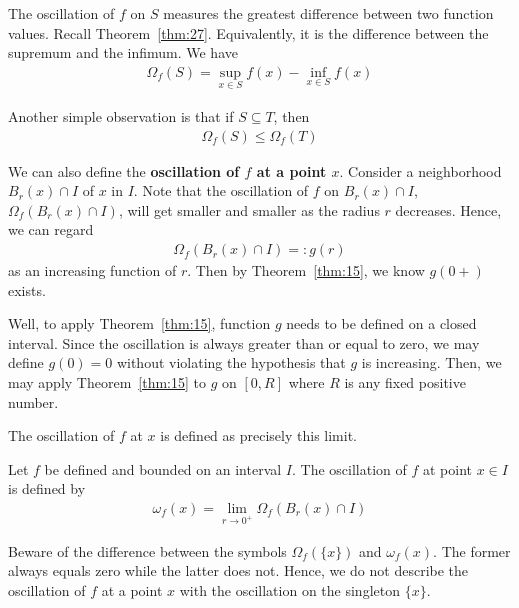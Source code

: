 \documentclass[thmcnt=section, 12pt]{my-elegantbook}
\begin{document}
The oscillation of $f$ on $S$ measures the
greatest difference between two function values.
Recall Theorem~\ref{thm:27}.
Equivalently, it is the difference between
the supremum and the infimum.
We have 
\begin{align*}
	\Omega_f (S)
	= \sup_{x \in S} f(x) - \inf_{x \in S} f(x)
\end{align*}

Another simple observation is that 
if $S \subseteq T$, then 
\begin{align*}
	\Omega_f(S) \leq \Omega_f(T)
\end{align*}


We can also define the \textbf{oscillation of $f$ at a point $x$}.
Consider a neighborhood $B_r(x) \cap I$ of $x$ in $I$.
Note that the oscillation of $f$ on $B_r(x) \cap I$, 
$\Omega_f(B_r(x) \cap I)$,
will get smaller and smaller
as the radius $r$ decreases.
Hence, we can regard 
\begin{align*}
	\Omega_f (B_r(x) \cap I) =: g(r)
\end{align*}
as an increasing function of $r$.
Then by Theorem~\ref{thm:15}, 
we know $g(0+)$ exists.
\begin{note}
	Well, to apply Theorem~\ref{thm:15},
	function $g$ needs to be defined on a closed interval.
	Since the oscillation is always greater than or equal to zero,
	we may define $g(0) = 0$
	without violating the hypothesis that $g$ is increasing.
	Then, we may apply Theorem~\ref{thm:15} to $g$ on $[0, R]$
	where $R$ is any fixed positive number.
\end{note}
\noindent The oscillation of $f$ at $x$ is defined as 
precisely this limit.

\begin{definition} \label{def:8}
	Let $f$ be defined and bounded on an interval $I$.
	The oscillation of $f$ at point $x \in I$ is
	defined by 
	\begin{align*}
		\omega_f(x)
		= \lim_{r \to 0^{+}} \Omega_f (B_r(x) \cap I)
	\end{align*}
\end{definition}

\begin{note}
	Beware of the difference between the symbols $\Omega_f(\{x\})$
	and $\omega_f(x)$.
	The former always equals zero while the latter does not.
	Hence, we do not describe the oscillation of $f$ at a point $x$
	with the oscillation on the singleton $\{x\}$.
\end{note}
\end{document}
